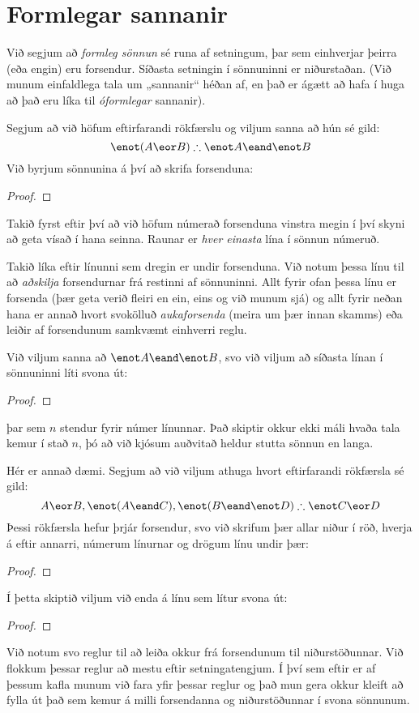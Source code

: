 \section{Formlegar sannanir}

Við segjum að \emph{formleg sönnun} sé runa af setningum, þar sem einhverjar þeirra (eða engin) eru forsendur. Síðasta setningin í sönnuninni er niðurstaðan. (Við munum einfaldlega tala um „sannanir“ héðan af, en það er ágætt að hafa í huga að það eru líka til \emph{óformlegar} sannanir).

Segjum að við höfum eftirfarandi rökfærslu og viljum sanna að hún sé gild:
	$$\enot (A \eor B) \therefore \enot A \eand \enot B$$
Við byrjum sönnunina á því að skrifa forsenduna:
\begin{proof}
\end{proof}
Takið fyrst eftir því að við höfum númerað forsenduna vinstra megin í því skyni að geta vísað í hana seinna. Raunar er \emph{hver einasta} lína í sönnun númeruð.

Takið líka eftir línunni sem dregin er undir forsenduna. Við notum þessa línu til að \emph{aðskilja} forsendurnar frá restinni af sönnuninni. Allt fyrir ofan þessa línu er forsenda (þær geta verið fleiri en ein, eins og við munum sjá) og allt fyrir neðan hana er annað hvort svokölluð \emph{aukaforsenda} (meira um þær innan skamms) eða leiðir af forsendunum samkvæmt einhverri reglu.

Við viljum sanna að $\enot A \eand \enot B$, svo við viljum að síðasta línan í sönnuninni líti svona út:
\begin{proof}
\end{proof}
þar sem $n$ stendur fyrir númer línunnar. Það skiptir okkur ekki máli hvaða tala kemur í stað $n$, þó að við kjósum auðvitað heldur stutta sönnun en langa.

Hér er annað dæmi. Segjum að við viljum athuga hvort eftirfarandi rökfærsla sé gild:
$$A\eor B, \enot (A\eand C), \enot (B \eand \enot D) \therefore \enot C\eor D$$
Þessi rökfærsla hefur þrjár forsendur, svo við skrifum þær allar niður í röð, hverja á eftir annarri, númerum línurnar og drögum línu undir þær:
\begin{proof}
\end{proof}
Í þetta skiptið viljum við enda á línu sem lítur svona út:
\begin{proof}
\end{proof}
Við notum svo reglur til að leiða okkur frá forsendunum til niðurstöðunnar. Við flokkum þessar reglur að mestu eftir setningatengjum. Í því sem eftir er af þessum kafla munum við fara yfir þessar reglur og það mun gera okkur kleift að fylla út það sem kemur á milli forsendanna og niðurstöðunnar í svona sönnunum.

